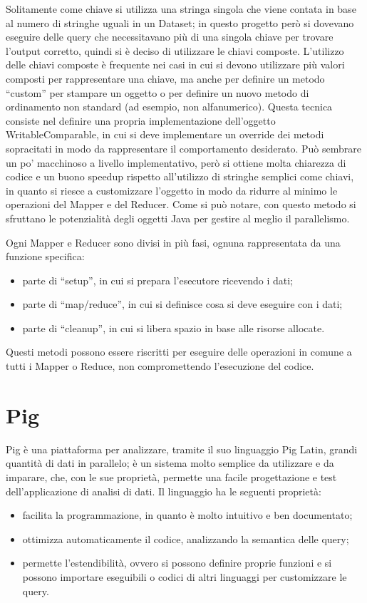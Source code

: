 \documentclass[11pt]{article} %
\begin{document}
Solitamente come chiave si utilizza una stringa singola che viene contata in base al numero di stringhe uguali in un Dataset; in questo progetto però si dovevano eseguire delle query che necessitavano più di una singola chiave per trovare l'output corretto, quindi si è deciso di utilizzare le chiavi composte.  L'utilizzo delle chiavi composte è frequente nei casi in cui si devono utilizzare più valori composti per rappresentare una chiave, ma anche per definire un metodo ``custom'' per stampare un oggetto o per definire un nuovo metodo di ordinamento non standard (ad esempio, non alfanumerico). Questa tecnica consiste nel definire una propria implementazione dell'oggetto WritableComparable, in cui si deve implementare un override dei metodi sopracitati in modo da rappresentare il comportamento desiderato. Può sembrare un po' macchinoso a livello implementativo, però si ottiene molta chiarezza di codice e un buono speedup rispetto all'utilizzo di stringhe semplici come chiavi, in quanto si riesce a customizzare l'oggetto in modo da ridurre al minimo le operazioni del Mapper e del Reducer. Come si può notare, con questo metodo si sfruttano le potenzialità degli oggetti Java per gestire al meglio il parallelismo.

Ogni Mapper e Reducer sono divisi in più fasi, ognuna rappresentata da una funzione specifica:
\begin{itemize}
\item parte di ``setup'', in cui si prepara l'esecutore ricevendo i dati;
\item parte di ``map/reduce'', in cui si definisce cosa si deve eseguire con i dati;
\item parte di ``cleanup'', in cui si libera spazio in base alle risorse allocate.
\end{itemize}

Questi metodi possono essere riscritti per eseguire delle operazioni in comune a tutti i Mapper o Reduce, non compromettendo l'esecuzione del codice.

\section{Pig}

Pig è una piattaforma per analizzare, tramite il suo linguaggio Pig Latin, grandi quantità di dati in parallelo; è un sistema molto semplice da utilizzare e da imparare, che, con le sue proprietà, permette una facile progettazione e test dell'applicazione di analisi di dati. Il linguaggio ha le seguenti proprietà:
\begin{itemize}
\item facilita la programmazione, in quanto è molto intuitivo e ben documentato;
\item ottimizza automaticamente il codice, analizzando la semantica delle query;
\item permette l'estendibilità, ovvero si possono definire proprie funzioni e si possono importare eseguibili o codici di altri linguaggi per customizzare le query.
\end{itemize}
\end{document}
